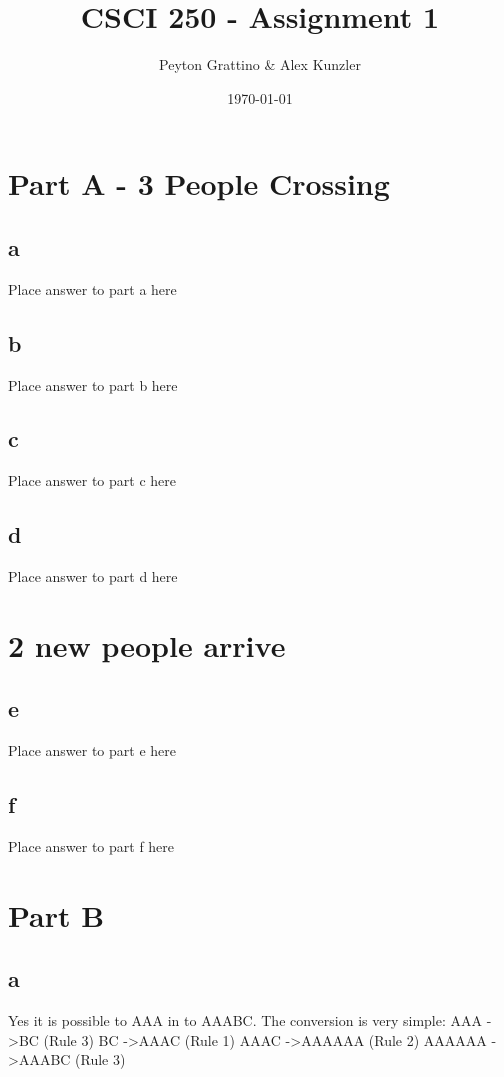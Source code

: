 \documentclass[12pt]{amsart}
\title{CSCI 250 - Assignment 1}
\author{Peyton Grattino \& Alex Kunzler}
\date{\today} %
\begin{document}
\maketitle
\tableofcontents

\pagebreak

\section*{Part A - 3 People Crossing}

\subsection*{a}
Place answer to part a here

\subsection*{b}
Place answer to part b here

\subsection*{c}
Place answer to part c here

\subsection*{d}
Place answer to part d here

\section*{2 new people arrive}

\subsection*{e}
Place answer to part e here

\subsection*{f}
Place answer to part f here

\newpage

\section*{Part B}
\subsection*{a}
Yes it is possible to AAA in to AAABC. The conversion is very simple:
\newline
AAA \quad -\textgreater \quad BC (Rule 3) %
\newline
BC \quad -\textgreater \quad AAAC (Rule 1) %
\newline
AAAC \quad -\textgreater \quad AAAAAA (Rule 2) %
\newline
AAAAAA \quad -\textgreater \quad AAABC (Rule 3) %
\end{document}
